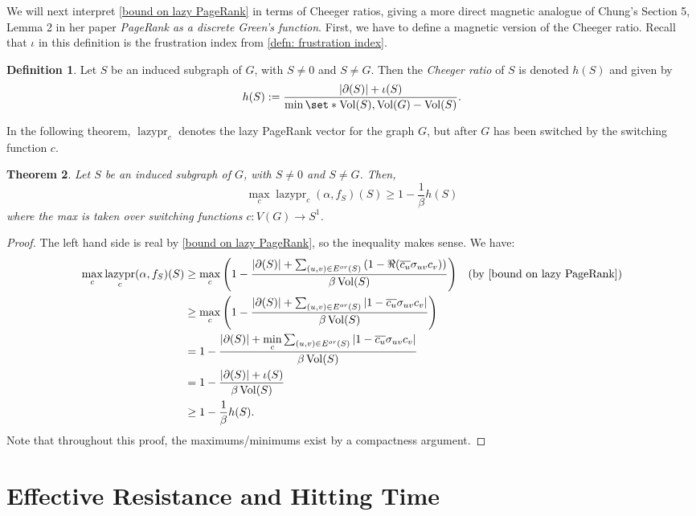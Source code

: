 \documentclass[12pt]{article}
\newtheorem{thm}{Theorem}
\theoremstyle{definition}
\newtheorem{defn}[thm]{Definition}
\DeclarePairedDelimiter\abs{\lvert}{\rvert}
\DeclareMathOperator{\lazypr}{lazypr}
\DeclareMathOperator{\vol}{Vol}
\begin{document}
We will next interpret \cref{bound on lazy PageRank} in terms of Cheeger ratios, giving a more direct magnetic analogue of Chung's Section 5, Lemma 2 in her paper \textit{PageRank as a discrete Green's function}. First, we have to define a magnetic version of the Cheeger ratio. Recall that $\iota$ in this definition is the frustration index from \cref{defn: frustration index}.

\begin{defn}
Let $S$ be an induced subgraph of $G$, with $S \neq 0$ and $S \neq G$. Then the \textit{Cheeger ratio} of $S$ is denoted $h(S)$ and given by
$$
h(S) := \frac{\abs*{\partial (S)} + \iota(S)}{\min \set*{\vol(S), \vol(G) - \vol(S)}}.
$$
\end{defn}

In the following theorem, $\lazypr_c$ denotes the lazy PageRank vector for the graph $G$, but after $G$ has been switched by the switching function $c$.

\begin{thm}
Let $S$ be an induced subgraph of $G$, with $S \neq 0$ and $S \neq G$. Then,
$$
\max_{c} \lazypr_c (\alpha, f_S) (S) \geq 1 - \frac{1}{\beta} h(S)
$$
where the max is taken over switching functions $c: V(G) \rightarrow S^1$.
\end{thm}
\begin{proof}
The left hand side is real by \cref{bound on lazy PageRank}, so the inequality makes sense. We have:
\begin{align*}
\max_{c} \lazypr_c (\alpha, f_S) (S)
&\geq \max_{c} \left( 1 - \frac{\abs*{\partial(S)} + \sum_{(u,v) \in E^{or}(S)}{(1 - \Re(\overline{c_u} \sigma_{uv} c_v))}}{\beta \vol (S)} \right) && \text{(by \cref{bound on lazy PageRank})} \\
& \geq \max_{c} \left( 1 - \frac{\abs*{\partial(S)} + \sum_{(u,v) \in E^{or}(S)}{\abs*{1 - \overline{c_u} \sigma_{uv} c_v}}}{\beta \vol (S)} \right) \\
&= 1 - \frac{\abs*{\partial(S)} + \min\limits_c \sum_{(u,v) \in E^{or}(S)}{\abs*{1 - \overline{c_u} \sigma_{uv} c_v}}}{\beta \vol (S)} \\
&= 1 - \frac{\abs*{\partial(S)} + \iota(S)}{\beta \vol (S)} \\
&\geq 1 - \frac{1}{\beta} h(S).
\end{align*}
Note that throughout this proof, the maximums/minimums exist by a compactness argument.
\end{proof}

\section{Effective Resistance and Hitting Time}
\end{document}
